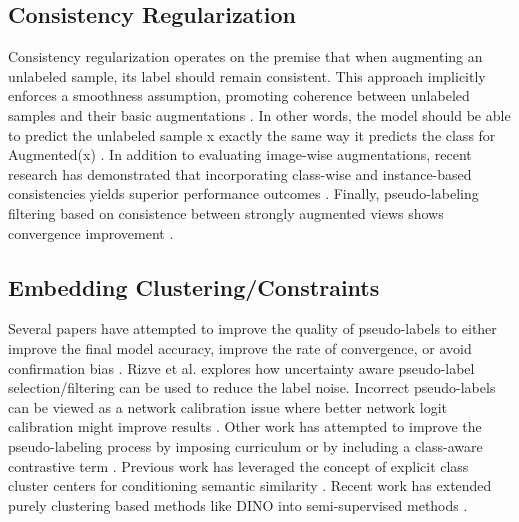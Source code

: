 \documentclass[10pt,twocolumn,letterpaper]{article}
\begin{document}
\subsection{Consistency Regularization}

Consistency regularization operates on the premise that when augmenting an unlabeled sample, its label should remain consistent. 
This approach implicitly enforces a smoothness assumption, promoting coherence between unlabeled samples and their basic augmentations \cite{xie2020unsupervised}. 
In other words, the model should be able to predict the unlabeled sample x exactly the same way it predicts the class for Augmented(x) \cite{berthelot2019mixmatch,sohn2020fixmatch,berthelot2019remixmatch,mustafa2020transformation}. 
In addition to evaluating image-wise augmentations, recent research has demonstrated that incorporating class-wise and instance-based consistencies yields superior performance outcomes \cite{zheng2022simmatch,li2021comatch}.
Finally, pseudo-labeling filtering based on consistence between strongly augmented views shows convergence improvement \cite{kim2022conmatch}.

\subsection{Embedding Clustering/Constraints}


Several papers have attempted to improve the quality of pseudo-labels to either improve the final model accuracy, improve the rate of convergence, or avoid confirmation bias \cite{arazo2020pseudo}.
Rizve et al. \cite{rizve2021defense} explores how uncertainty aware pseudo-label selection/filtering can be used to reduce the label noise.
Incorrect pseudo-labels can be viewed as a network calibration issue \cite{rizve2021defense} where better network logit calibration might improve results \cite{Xing2020DistanceBased}.
Other work has attempted to improve the pseudo-labeling process by imposing curriculum \cite{zhang2021flexmatch} or by including a class-aware contrastive term \cite{yang2022class}.
Previous work has leveraged the concept of explicit class cluster centers for conditioning semantic similarity \cite{zheng2022simmatch}.
Recent work has extended purely clustering based methods like DINO \cite{caron2021emerging} into semi-supervised methods \cite{fini2023semi}.
\end{document}
